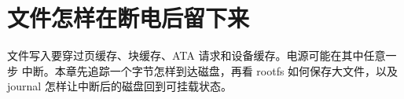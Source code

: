 \chapter{文件怎样在断电后留下来}

文件写入要穿过页缓存、块缓存、ATA 请求和设备缓存。电源可能在其中任意一步
中断。本章先追踪一个字节怎样到达磁盘，再看 rootfs 如何保存大文件，以及
journal 怎样让中断后的磁盘回到可挂载状态。







